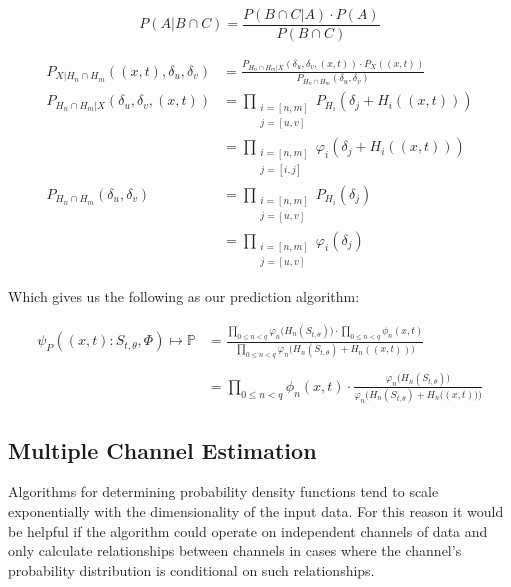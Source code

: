 \documentclass[10pt]{article}
\begin{document}
\[ P(A|B \cap C) = \frac{ P(B \cap C|A) \cdot P(A) }{ P(B \cap C) } \]

\begin{align}
P_{X|H_n \cap H_m} \left( (x,t), \delta_u, \delta_v \right) &=
	\frac { P_{H_n \cap H_m | X} \left( \delta_u, \delta_v, (x,t) \right) \cdot P_X \left( (x,t) \right) } { P_{H_n \cap H_m} \left( \delta_u, \delta_v \right) } \nonumber \\
P_{H_n \cap H_m | X} \left( \delta_u, \delta_v, (x,t) \right) &= 
	\prod_{\substack{i=[n,m] \\ j=[u,v]}} P_{H_i} \left( \delta_j + H_i((x,t)) \right) \nonumber 
\\
&= \prod_{\substack{i=[n,m]\\j=[i,j]}} \varphi_i \left( \delta_j + H_i((x,t)) \right) \\
P_{H_n \cap H_m} \left( \delta_u, \delta_v \right) &= 
	\prod_{\substack{i=[n,m]\\j=[u,v]}} P_{H_i} \left( \delta_j \right) \nonumber 
\\
&= \prod_{\substack{i=[n,m]\\j=[u,v]}} \varphi_i( \delta_j )
\end{align}

Which gives us the following as our prediction algorithm:

\begin{align}
\psi_P \left( (x,t) :S_{t,\theta}, \Phi \right) \mapsto \mathbb{P} 
	&= \frac{ \prod_{0 \le n < q} \varphi_n \big( H_n(S_{t,\theta}) \big) \cdot \prod_{0 \le n < q} \phi_n(x,t) }{ \prod_{0 \le n < q} \varphi_n \big( H_n(S_{t,\theta}) + H_n((x,t)) \big) }  \nonumber \\
\nonumber \\
&= \label{eq:predSingle} \prod_{0 \le n < q} \phi_n(x,t) \cdot \frac{ \varphi_n \Big( H_n(S_{t,\theta}) \Big) }{ \varphi_n \Big( H_n(S_{t,\theta}) + H_n\big((x,t)\big) \Big) }
\end{align}


\subsection{Multiple Channel Estimation}
Algorithms for determining probability density functions tend to scale exponentially with the dimensionality of the input data.  For this reason it would be helpful if the algorithm could operate on independent channels of data and only calculate relationships between channels in cases where the channel's probability distribution is conditional on such relationships.
\end{document}
